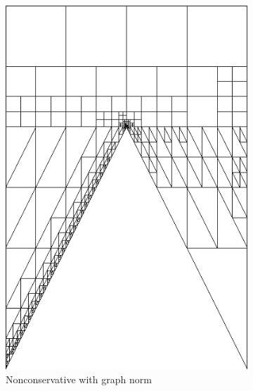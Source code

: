 \documentclass[letterpaper]{article}
\begin{document}
\begin{figure}
\centering
\begin{subfigure}[t]{0.4\textwidth}
\centering
\includegraphics[width=\textwidth]{figs/Wedge/graph16nc_mesh.png}
\caption{Nonconservative with graph norm}
\label{fig:wedgeGraph16nc_mesh}
\end{subfigure}
\begin{subfigure}[t]{0.4\textwidth}
\centering

\end{subfigure}
\end{figure}
\end{document}
